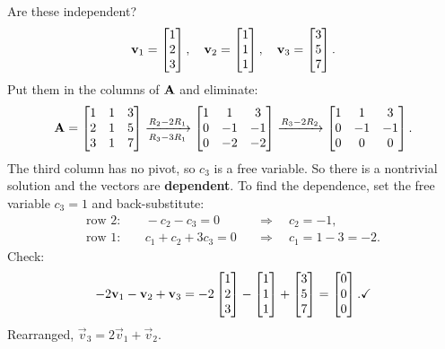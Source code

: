 \begin{example}
\label{ch14:ex-test3}
Are these independent?
\[
  \mathbf{v}_1=\begin{bmatrix}1\\2\\3\end{bmatrix},\quad
  \mathbf{v}_2=\begin{bmatrix}1\\1\\1\end{bmatrix},\quad
  \mathbf{v}_3=\begin{bmatrix}3\\5\\7\end{bmatrix}.
\]
Put them in the columns of $\mathbf{A}$ and eliminate:
\[
  \mathbf{A}=\begin{bmatrix} 1 & 1 & 3\\ 2 & 1 & 5\\ 3 & 1 & 7\end{bmatrix}
  \xrightarrow[R_3-3R_1]{R_2-2R_1}
  \begin{bmatrix} 1 & 1 & 3\\ 0 & -1 & -1\\ 0 & -2 & -2\end{bmatrix}
  \xrightarrow{R_3-2R_2}
  \begin{bmatrix} 1 & 1 & 3\\ 0 & -1 & -1\\ 0 & 0 & 0\end{bmatrix}.
\]
The third column has no pivot, so $c_3$ is a free variable. So there is a
nontrivial solution and the vectors are \textbf{dependent}. To find the dependence,
set the free variable $c_3 = 1$ and back-substitute:
\begin{align*}
  \text{row } 2:&\quad -c_2 - c_3 = 0 &&\Rightarrow\quad c_2 = -1,\\
  \text{row } 1:&\quad c_1 + c_2 + 3c_3 = 0 &&\Rightarrow\quad c_1 = 1 - 3 = -2.
\end{align*}
Check:
\[
  -2\mathbf{v}_1 - \mathbf{v}_2 + \mathbf{v}_3
  = -2\begin{bmatrix}1\\2\\3\end{bmatrix} - \begin{bmatrix}1\\1\\1\end{bmatrix} + \begin{bmatrix}3\\5\\7\end{bmatrix}
  = \begin{bmatrix}0\\0\\0\end{bmatrix}. \checkmark
\]
Rearranged, $\vec{v}_3 = 2\vec{v}_1 + \vec{v}_2$.
\end{example}


